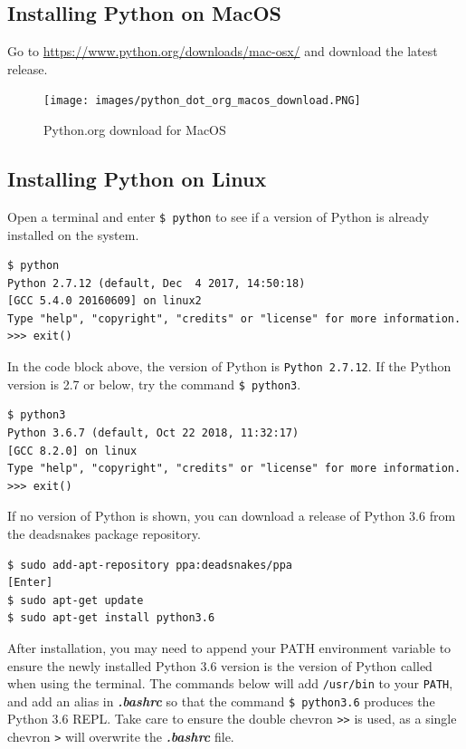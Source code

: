 \documentclass{book}
\begin{document}
    
        \subsection{Installing Python on
MacOS}\label{installing-python-on-macos}

Go to \url{https://www.python.org/downloads/mac-osx/} and download the
latest release.

\begin{figure}
\centering
\texttt{[image: images/python\_dot\_org\_macos\_download.PNG]}
\caption{Python.org download for MacOS}
\end{figure}
    




    
        \subsection{Installing Python on
Linux}\label{installing-python-on-linux}

Open a terminal and enter \lstinline!$ python! to see if a version of
Python is already installed on the system.

\begin{lstlisting}
$ python
Python 2.7.12 (default, Dec  4 2017, 14:50:18)
[GCC 5.4.0 20160609] on linux2
Type "help", "copyright", "credits" or "license" for more information.
>>> exit()
\end{lstlisting}

In the code block above, the version of Python is
\lstinline!Python 2.7.12!. If the Python version is 2.7 or below, try
the command \lstinline!$ python3!.

\begin{lstlisting}
$ python3
Python 3.6.7 (default, Oct 22 2018, 11:32:17) 
[GCC 8.2.0] on linux
Type "help", "copyright", "credits" or "license" for more information.
>>> exit()
\end{lstlisting}

If no version of Python is shown, you can download a release of Python
3.6 from the deadsnakes package repository.

\begin{lstlisting}
$ sudo add-apt-repository ppa:deadsnakes/ppa
[Enter]
$ sudo apt-get update
$ sudo apt-get install python3.6
\end{lstlisting}

After installation, you may need to append your PATH environment
variable to ensure the newly installed Python 3.6 version is the version
of Python called when using the terminal. The commands below will add
\lstinline!/usr/bin! to your \lstinline!PATH!, and add an alias in
\textbf{\emph{.bashrc}} so that the command \lstinline!$ python3.6!
produces the Python 3.6 REPL. Take care to ensure the double chevron
\lstinline!>>! is used, as a single chevron \lstinline!>! will overwrite
the \textbf{\emph{.bashrc}} file.
\end{document}
